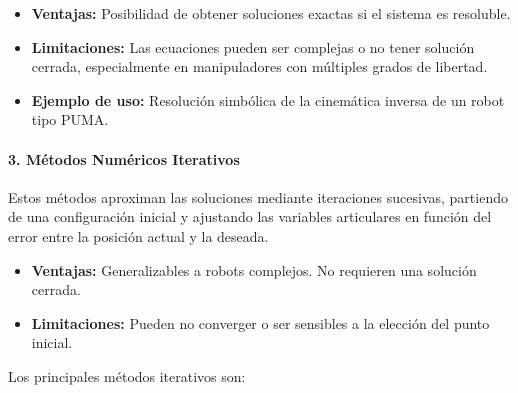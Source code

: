 \begin{itemize}
	\item \textbf{Ventajas:} Posibilidad de obtener soluciones exactas si el sistema es resoluble.
	\item \textbf{Limitaciones:} Las ecuaciones pueden ser complejas o no tener solución cerrada, especialmente en manipuladores con múltiples grados de libertad.
	\item \textbf{Ejemplo de uso:} Resolución simbólica de la cinemática inversa de un robot tipo PUMA.
\end{itemize}

\paragraph{3. Métodos Numéricos Iterativos}

Estos métodos aproximan las soluciones mediante iteraciones sucesivas, partiendo de una configuración inicial y ajustando las variables articulares en función del error entre la posición actual y la deseada.

\begin{itemize}
	\item \textbf{Ventajas:} Generalizables a robots complejos. No requieren una solución cerrada.
	\item \textbf{Limitaciones:} Pueden no converger o ser sensibles a la elección del punto inicial.
\end{itemize}

Los principales métodos iterativos son:

